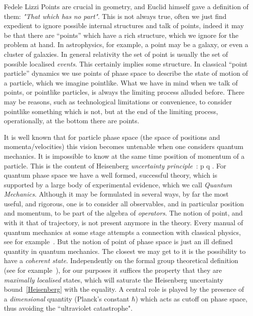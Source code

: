 \begin{artengenv}{Fedele Lizzi}
Points are crucial in geometry, and Euclid himself gave a definition of them: \emph{"That which has no part"}. This is not always true, often we just find expedient to ignore possible internal structures and talk of points, indeed it may be that there are ``points'' which have a rich structure, which we ignore for the problem at hand. 
In astrophysics, for example, a point may be a galaxy, or even a cluster of galaxies. 
In general relativity the set of point is usually the set of possible localised \emph{events}. This certainly implies some structure. 
In classical ``point particle'' dynamics we use points of phase space to describe the state of motion of a particle, which we imagine pointlike. What we have in mind when we talk of points, or pointlike particles, is always the limiting process alluded before. There may be reasons, such as technological limitations or convenience, to consider pointlike something which is not, but at the end of the limiting process, operationally, at the bottom there are points.

It is well known that for particle phase space (the space of positions and momenta/velocities) this vision becomes untenable when one considers quantum mechanics. It is impossible to know at the same time position of momentum of a particle. This is the content of Heisenberg \emph{uncertainty principle}~\cite{Heisenberguncert}:
\be
\Delta p \Delta q \geq \frac{} . \label{Heisenberg}
\ee
For quantum phase space we have a well formed, successful theory, which is supported by a large body of experimental evidence, which we call \emph{Quantum Mechanics}. Although it may be formulated in several ways, by far the most useful, and rigorous, one is to consider all observables, and in particular position and momentum, to be part of the algebra of \emph{operators}. The notion of point, and with it that of trajectory, is not present anymore in the theory. Every manual of quantum mechanics at some stage attempts a connection with classical physics, see for example~\cite[Sect.~II.4]{Messiah}. But the notion of point of phase space is just  an ill defined quantity in quantum mechanics. The closest we may get to it is the possibility to have a \emph{coherent state}. Independently on the formal group theoretical definition (see for example~\cite{Perelomov}), for our purposes it suffices the property that they are \emph{maximally localised} states, which will saturate the Heisenberg uncertainty bound~\eqref{Heisenberg} with the equality. A central role is played by the presence of a \emph{dimensional} quantity (Planck's constant $\hbar$) which acts as cutoff on phase space, thus avoiding the ``ultraviolet catastrophe".


\end{artengenv}

